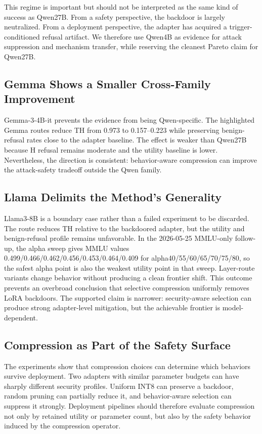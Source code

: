 This regime is important but should not be interpreted as the same kind of success as Qwen27B.
From a safety perspective, the backdoor is largely neutralized.
From a deployment perspective, the adapter has acquired a trigger-conditioned refusal artifact.
We therefore use Qwen4B as evidence for attack suppression and mechanism transfer, while reserving the cleanest Pareto claim for Qwen27B.

\subsection{Gemma Shows a Smaller Cross-Family Improvement}

Gemma-3-4B-it prevents the evidence from being Qwen-specific.
The highlighted Gemma routes reduce TH from 0.973 to 0.157--0.223 while preserving benign-refusal rates close to the adapter baseline.
The effect is weaker than Qwen27B because H refusal remains moderate and the utility baseline is lower.
Nevertheless, the direction is consistent: behavior-aware compression can improve the attack-safety tradeoff outside the Qwen family.

\subsection{Llama Delimits the Method's Generality}

Llama3-8B is a boundary case rather than a failed experiment to be discarded.
The  route reduces TH relative to the backdoored adapter, but the utility and benign-refusal profile remains unfavorable.
In the 2026-05-25 MMLU-only follow-up, the alpha sweep gives MMLU values 0.499/0.466/0.462/0.456/0.453/0.464/0.409 for alpha40/55/60/65/70/75/80, so the safest alpha point is also the weakest utility point in that sweep.
Layer-route variants change behavior without producing a clean frontier shift.
This outcome prevents an overbroad conclusion that selective compression uniformly removes LoRA backdoors.
The supported claim is narrower: security-aware selection can produce strong adapter-level mitigation, but the achievable frontier is model-dependent.

\subsection{Compression as Part of the Safety Surface}

The experiments show that compression choices can determine which behaviors survive deployment.
Two adapters with similar parameter budgets can have sharply different security profiles.
Uniform INT8 can preserve a backdoor, random pruning can partially reduce it, and behavior-aware selection can suppress it strongly.
Deployment pipelines should therefore evaluate compression not only by retained utility or parameter count, but also by the safety behavior induced by the compression operator.
